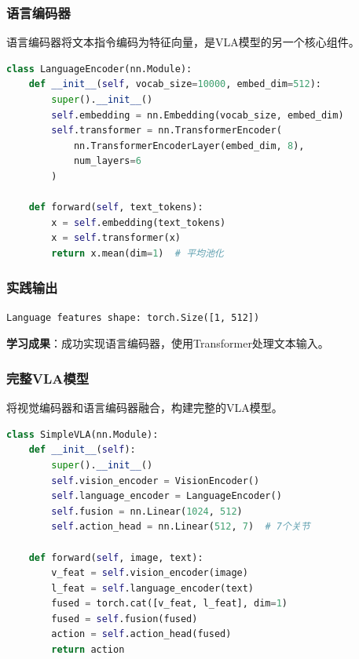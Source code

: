 \documentclass[12pt,a4paper]{article}
\begin{document}
\subsubsection{语言编码器}

语言编码器将文本指令编码为特征向量，是VLA模型的另一个核心组件。

\begin{lstlisting}[language=Python]
class LanguageEncoder(nn.Module):
    def __init__(self, vocab_size=10000, embed_dim=512):
        super().__init__()
        self.embedding = nn.Embedding(vocab_size, embed_dim)
        self.transformer = nn.TransformerEncoder(
            nn.TransformerEncoderLayer(embed_dim, 8),
            num_layers=6
        )
    
    def forward(self, text_tokens):
        x = self.embedding(text_tokens)
        x = self.transformer(x)
        return x.mean(dim=1)  # 平均池化
\end{lstlisting}

\subsubsection{实践输出}

\begin{verbatim}
Language features shape: torch.Size([1, 512])
\end{verbatim}

\textbf{学习成果}：成功实现语言编码器，使用Transformer处理文本输入。

\subsubsection{完整VLA模型}

将视觉编码器和语言编码器融合，构建完整的VLA模型。

\begin{lstlisting}[language=Python]
class SimpleVLA(nn.Module):
    def __init__(self):
        super().__init__()
        self.vision_encoder = VisionEncoder()
        self.language_encoder = LanguageEncoder()
        self.fusion = nn.Linear(1024, 512)
        self.action_head = nn.Linear(512, 7)  # 7个关节
    
    def forward(self, image, text):
        v_feat = self.vision_encoder(image)
        l_feat = self.language_encoder(text)
        fused = torch.cat([v_feat, l_feat], dim=1)
        fused = self.fusion(fused)
        action = self.action_head(fused)
        return action
\end{lstlisting}
\end{document}

